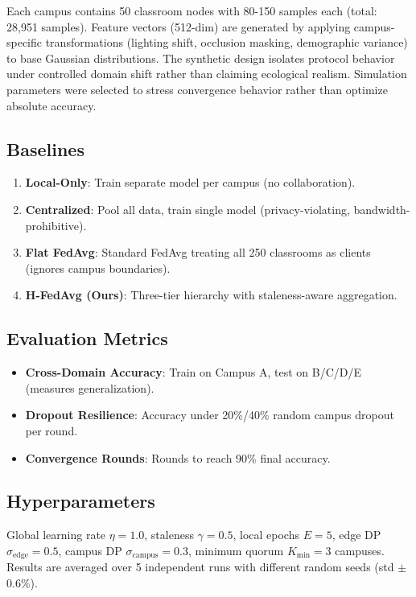 \documentclass[conference]{IEEEtran}
\begin{document}
Each campus contains 50 classroom nodes with 80-150 samples each (total: 28,951 samples). Feature vectors (512-dim) are generated by applying campus-specific transformations (lighting shift, occlusion masking, demographic variance) to base Gaussian distributions. The synthetic design isolates protocol behavior under controlled domain shift rather than claiming ecological realism. Simulation parameters were selected to stress convergence behavior rather than optimize absolute accuracy.

\subsection{Baselines}

\begin{enumerate}
    \item \textbf{Local-Only}: Train separate model per campus (no collaboration).
    \item \textbf{Centralized}: Pool all data, train single model (privacy-violating, bandwidth-prohibitive).
    \item \textbf{Flat FedAvg}: Standard FedAvg treating all 250 classrooms as clients (ignores campus boundaries).
    \item \textbf{H-FedAvg (Ours)}: Three-tier hierarchy with staleness-aware aggregation.
\end{enumerate}

\subsection{Evaluation Metrics}

\begin{itemize}
    \item \textbf{Cross-Domain Accuracy}: Train on Campus A, test on B/C/D/E (measures generalization).
    \item \textbf{Dropout Resilience}: Accuracy under 20\%/40\% random campus dropout per round.
    \item \textbf{Convergence Rounds}: Rounds to reach 90\% final accuracy.
\end{itemize}

\subsection{Hyperparameters}

Global learning rate $\eta = 1.0$, staleness $\gamma = 0.5$, local epochs $E = 5$, edge DP $\sigma_{\text{edge}} = 0.5$, campus DP $\sigma_{\text{campus}} = 0.3$, minimum quorum $K_{\min} = 3$ campuses. Results are averaged over 5 independent runs with different random seeds (std $\pm$0.6\%).
\end{document}
